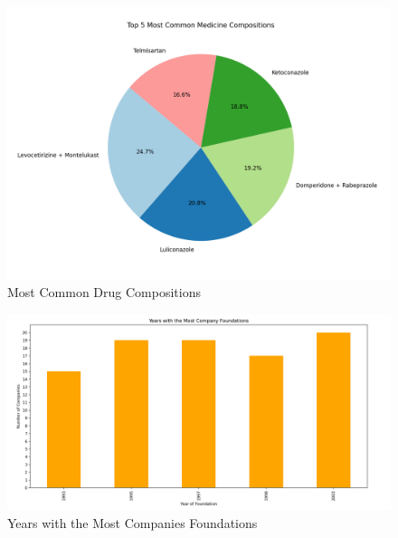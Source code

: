 \documentclass[sigconf]{acmart}
\begin{document}
\begin{figure}[H]
	\centering
	\includegraphics[width=\linewidth]{graphic6.png}
	\caption{Most Common Drug Compositions}
	\label{fig:uml}
  \end{figure}   

\begin{figure}[H]
	\centering
	\includegraphics[width=\linewidth]{graphic7.png}
	\caption{Years with the Most Companies Foundations}
	\label{fig:uml}
  \end{figure}





\end{document}

